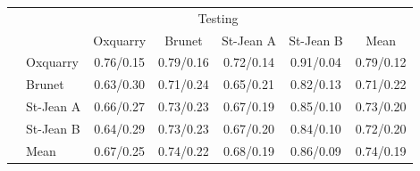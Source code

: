 \begin{table*}[!t]
  \vspace{0.5cm}

  \begin{tabular}{l l| c c c c|c}
    \toprule
    \multicolumn{2}{c}{\multirow{2}{*}{}} & \multicolumn{4}{c}{Testing} \\
    \multicolumn{2}{c}{} & Oxquarry & Brunet & St-Jean A & St-Jean B & Mean \\
    \midrule
    \parbox[!t]{2mm}{}
    & Oxquarry  & 0.76/0.15 & 0.79/0.16 & 0.72/0.14 & 0.91/0.04 & 0.79/0.12 \\
    & Brunet    & 0.63/0.30 & 0.71/0.24 & 0.65/0.21 & 0.82/0.13 & 0.71/0.22 \\
    & St-Jean A & 0.66/0.27 & 0.73/0.23 & 0.67/0.19 & 0.85/0.10 & 0.73/0.20 \\
    & St-Jean B & 0.64/0.29 & 0.73/0.23 & 0.67/0.20 & 0.84/0.10 & 0.72/0.20 \\
    \midrule
    & Mean      & 0.67/0.25 & 0.74/0.22 & 0.68/0.19 & 0.86/0.09 & 0.74/0.19 \\
    \bottomrule
  \end{tabular}
\end{table*}
